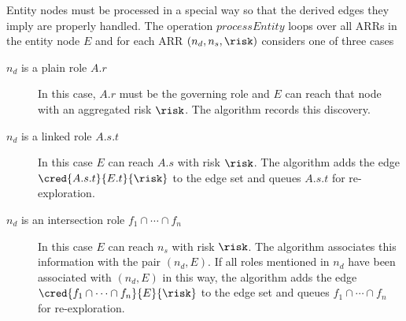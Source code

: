 Entity nodes must be processed in a special way so that the derived
edges they imply are properly handled. The operation
$\mathit{processEntity}$ loops over all ARRs in the entity node $E$ and
for each ARR $(n_d, n_s, \risk)$ considers one of three cases
\begin{description}
\item[$n_d$ is a plain role $A.r$] In this case, $A.r$ must be the
  governing role and $E$ can reach that node with an aggregated risk
  $\risk$. The algorithm records this discovery.
\item[$n_d$ is a linked role $A.s.t$] In this case $E$ can reach $A.s$
  with risk $\risk$. The algorithm adds the edge
  $\cred{A.s.t}{E.t}{\risk}$ to the edge set and queues $A.s.t$ for
  re-exploration.
\item[$n_d$ is an intersection role $f_1 \cap \cdots \cap f_n$] In this
  case $E$ can reach $n_s$ with risk $\risk$. The algorithm associates
  this information with the pair $(n_d, E)$. If all roles mentioned in
  $n_d$ have been associated with $(n_d, E)$ in this way, the algorithm
  adds the edge $\cred{f_1 \cap \cdots \cap f_n}{E}{\risk}$ to the edge
  set and queues $f_1 \cap \cdots \cap f_n$ for re-exploration.
\end{description}

